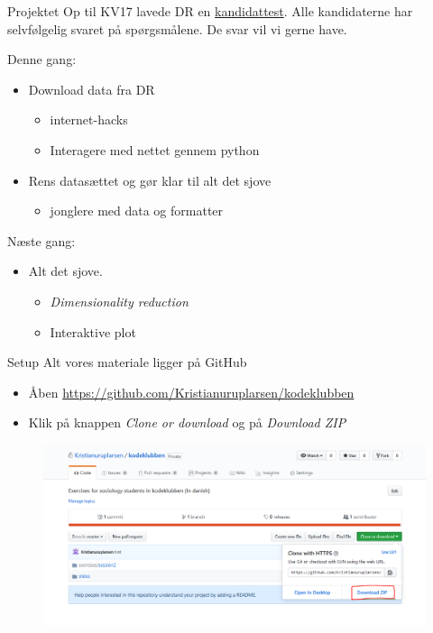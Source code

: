 \documentclass[10pt, hyperref = {colorlinks=true, linkcolor=green}]{beamer}
\begin{document}
\begin{frame}[fragile]{Projektet}
Op til KV17 lavede DR en \href{https://www.dr.dk/nyheder/politik/kv17/kandidat-testen}{kandidattest}. Alle kandidaterne har selvfølgelig svaret på spørgsmålene. De svar vil vi gerne have.

Denne gang:
\begin{itemize}
  \item Download data fra DR
  \begin{itemize}
    \item internet-hacks
    \item Interagere med nettet gennem python
  \end{itemize}
  \item Rens datasættet og gør klar til alt det sjove
  \begin{itemize}
    \item jonglere med data og formatter
  \end{itemize}
\end{itemize}

Næste gang:
\begin{itemize}
  \item Alt det sjove.
  \begin{itemize}
    \item \textit{Dimensionality reduction}
    \item Interaktive plot
  \end{itemize}
\end{itemize}
\end{frame}


\begin{frame}[fragile]{Setup}
  Alt vores materiale ligger på GitHub
\begin{itemize}
  \item Åben \href{https://github.com/Kristianuruplarsen/kodeklubben}{https://github.com/Kristianuruplarsen/kodeklubben}
  \item Klik på knappen \textit{Clone or download} og på \textit{Download ZIP}
\end{itemize}

\begin{figure}
  \center
  \includegraphics[width=\textwidth]{figs/setup.PNG}
\end{figure}
\end{frame}
\end{document}
